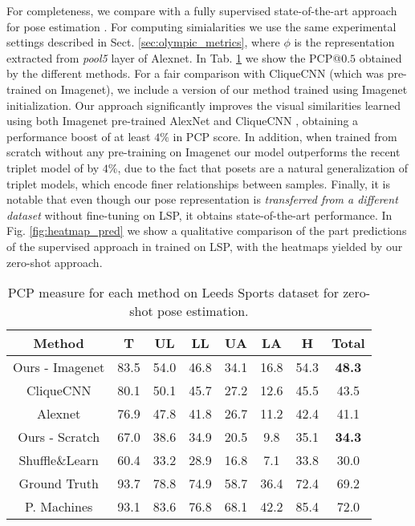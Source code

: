 \documentclass[10pt,twocolumn,letterpaper]{article}
\begin{document}
For completeness, we compare with a fully supervised state-of-the-art approach for pose estimation \cite{posemachines}. For computing simialarities we use the same experimental settings described in Sect. \ref{sec:olympic_metrics}, where $\phi$ is the representation extracted from \emph{pool5} layer of Alexnet. In Tab. \ref{tab:results_lsp} we show the PCP@$0.5$ obtained by the different methods. For a fair comparison with CliqueCNN \cite{cliquecnn} (which was pre-trained on Imagenet), we include a version of our method trained using Imagenet initialization. Our approach significantly improves the visual similarities learned using both Imagenet pre-trained AlexNet and CliqueCNN \cite{cliquecnn}, obtaining a performance boost of at least $4\%$ in PCP score. In addition, when trained from scratch without any pre-training on Imagenet our model outperforms the recent triplet model of \cite{shuffleandlearn} by $4\%$, due to the fact that posets are a natural generalization of triplet models, which encode finer relationships between samples. Finally, it is notable that even though our pose representation is \emph{transferred from a different dataset} without fine-tuning on LSP, it obtains state-of-the-art performance. In Fig. \ref{fig:heatmap_pred} we show a qualitative comparison of the part predictions of the supervised approach in \cite{deeppose} trained on LSP, with the heatmaps yielded by our zero-shot approach. 

\begin{table}[!t]
    \scriptsize
    \centering
    \begin{tabular}{|c|c|c|c|c|c|c|c|}
    \hline
    Method  &T &UL &LL &UA &LA &H  &Total \\
    \hline
    Ours - Imagenet & 83.5 & 54.0 & 46.8 & 34.1 & 16.8 & 54.3 &  \textbf{48.3}\\
    \hline
    CliqueCNN \cite{cliquecnn}  & 80.1 & 50.1 & 45.7 & 27.2 & 12.6 &  45.5 &  43.5 \\
    \hline
    Alexnet\cite{alexnet}& 76.9 & 47.8 & 41.8 & 26.7 & 11.2 & 42.4 & 41.1 \\
    \hline
    \hline
    Ours - Scratch & 67.0 & 38.6 & 34.9 & 20.5 & 9.8 & 35.1 &  \textbf{34.3}\\
    \hline
    Shuffle\&Learn \cite{shuffleandlearn}  & 60.4  & 33.2 & 28.9 & 16.8 & 7.1 &  33.8 &  30.0\\
    \hline
    \hline
    Ground Truth & 93.7  & 78.8 & 74.9 & 58.7 & 36.4 & 72.4 & 69.2\\
    \hline
    \hline
    P. Machines \cite{posemachines} & 93.1 & 83.6 & 76.8 & 68.1 & 42.2 & 85.4 & 72.0 \\
    \hline
    \end{tabular}
    \caption{PCP measure for each method on Leeds Sports dataset for zero-shot pose estimation.}
    \label{tab:results_lsp}
\end{table}
\end{document}
